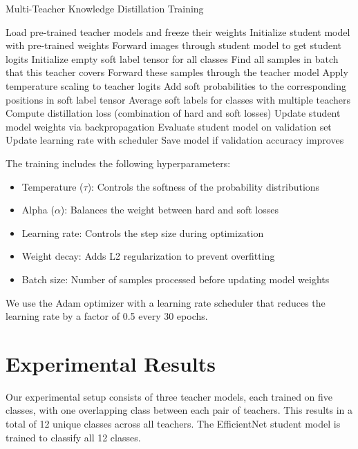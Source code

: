 \documentclass[conference]{IEEEtran}
\begin{document}
\begin{algorithm}
\caption{Multi-Teacher Knowledge Distillation Training}
\begin{algorithmic}[1]
\State Load pre-trained teacher models and freeze their weights
\State Initialize student model with pre-trained weights
        \State Forward images through student model to get student logits
        \State Initialize empty soft label tensor for all classes
            \State Find all samples in batch that this teacher covers
            \State Forward these samples through the teacher model
            \State Apply temperature scaling to teacher logits
            \State Add soft probabilities to the corresponding positions in soft label tensor
        \EndFor
        \State Average soft labels for classes with multiple teachers
        \State Compute distillation loss (combination of hard and soft losses)
        \State Update student model weights via backpropagation
    \EndFor
    \State Evaluate student model on validation set
    \State Update learning rate with scheduler
    \State Save model if validation accuracy improves
\EndFor
\end{algorithmic}
\end{algorithm}

The training includes the following hyperparameters:
\begin{itemize}
    \item Temperature ($\tau$): Controls the softness of the probability distributions
    \item Alpha ($\alpha$): Balances the weight between hard and soft losses
    \item Learning rate: Controls the step size during optimization
    \item Weight decay: Adds L2 regularization to prevent overfitting
    \item Batch size: Number of samples processed before updating model weights
\end{itemize}

We use the Adam optimizer with a learning rate scheduler that reduces the learning rate by a factor of 0.5 every 30 epochs.

\section{Experimental Results}
Our experimental setup consists of three teacher models, each trained on five classes, with one overlapping class between each pair of teachers. This results in a total of 12 unique classes across all teachers. The EfficientNet student model is trained to classify all 12 classes.
\end{document}
